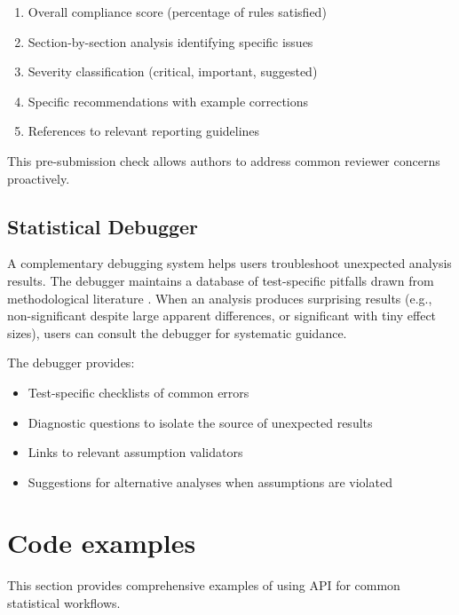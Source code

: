 \documentclass[article]{jss}
\begin{document}
\begin{enumerate}
\item Overall compliance score (percentage of rules satisfied)
\item Section-by-section analysis identifying specific issues
\item Severity classification (critical, important, suggested)
\item Specific recommendations with example corrections
\item References to relevant reporting guidelines
\end{enumerate}

This pre-submission check allows authors to address common reviewer concerns proactively.

\subsection{Statistical Debugger}

A complementary debugging system helps users troubleshoot unexpected analysis results. The debugger maintains a database of test-specific pitfalls drawn from methodological literature \citep{keselman1998statistical, zimmerman2004note, osborne2010improving}. When an analysis produces surprising results (e.g., non-significant despite large apparent differences, or significant with tiny effect sizes), users can consult the debugger for systematic guidance.

The debugger provides:
\begin{itemize}
\item Test-specific checklists of common errors
\item Diagnostic questions to isolate the source of unexpected results
\item Links to relevant assumption validators
\item Suggestions for alternative analyses when assumptions are violated
\end{itemize}


\section{Code examples} \label{sec:code}

This section provides comprehensive examples of using  API for common statistical workflows.
\end{document}
